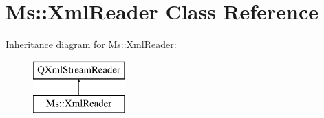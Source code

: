 \hypertarget{class_ms_1_1_xml_reader}{}\section{Ms\+:\+:Xml\+Reader Class Reference}
\label{class_ms_1_1_xml_reader}
Inheritance diagram for Ms\+:\+:Xml\+Reader\+:\begin{figure}[H]
\begin{center}
\leavevmode
\includegraphics[height=2.000000cm]{class_ms_1_1_xml_reader}
\end{center}
\end{figure}

